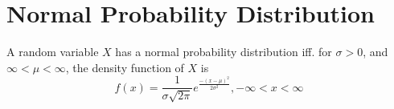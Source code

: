\section{Normal Probability Distribution}

\begin{definition}
    A random variable $X$ has a normal probability distribution iff.
    for $\sigma > 0$, and $\infty < \mu < \infty$, the density function of $X$ is
    \[
    f(x) 
        = \frac{1}{\sigma\sqrt{2\pi}} 
            e^{\frac{{-(x - \mu)}^2}{2\sigma^2}}
        , -\infty < x < \infty
    \]
\end{definition}